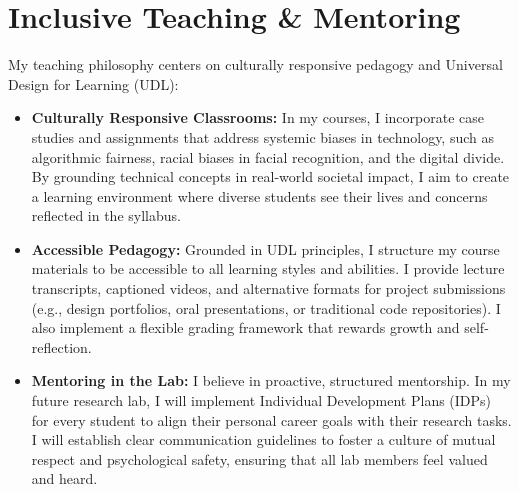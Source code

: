 \section{Inclusive Teaching \& Mentoring}

My teaching philosophy centers on culturally responsive pedagogy and Universal Design for Learning (UDL):

\begin{itemize}
    \item \textbf{Culturally Responsive Classrooms:} In my courses, I incorporate case studies and assignments that address systemic biases in technology, such as algorithmic fairness, racial biases in facial recognition, and the digital divide. By grounding technical concepts in real-world societal impact, I aim to create a learning environment where diverse students see their lives and concerns reflected in the syllabus.
    \item \textbf{Accessible Pedagogy:} Grounded in UDL principles, I structure my course materials to be accessible to all learning styles and abilities. I provide lecture transcripts, captioned videos, and alternative formats for project submissions (e.g., design portfolios, oral presentations, or traditional code repositories). I also implement a flexible grading framework that rewards growth and self-reflection.
    \item \textbf{Mentoring in the Lab:} I believe in proactive, structured mentorship. In my future research lab, I will implement Individual Development Plans (IDPs) for every student to align their personal career goals with their research tasks. I will establish clear communication guidelines to foster a culture of mutual respect and psychological safety, ensuring that all lab members feel valued and heard.
\end{itemize}

